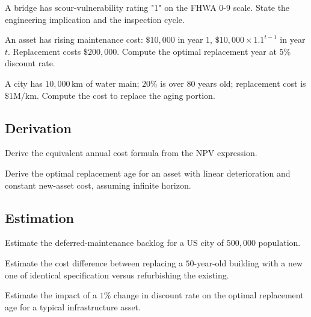 \begin{exercise}
A bridge has scour-vulnerability rating "1" on the FHWA $0$-$9$ scale. State the engineering implication and the inspection cycle.
\end{exercise}

\begin{exercise}
An asset has rising maintenance cost: $\$10{,}000$ in year $1$, $\$10{,}000 \times 1.1^{t-1}$ in year $t$. Replacement costs $\$200{,}000$. Compute the optimal replacement year at $5\%$ discount rate.
\end{exercise}

\begin{exercise}
A city has $10{,}000\,\text{km}$ of water main; $20\%$ is over $80$ years old; replacement cost is $\$1\text{M/km}$. Compute the cost to replace the aging portion.
\end{exercise}

\subsection*{Derivation}

\begin{exercise}
Derive the equivalent annual cost formula from the NPV expression.
\end{exercise}

\begin{exercise}
Derive the optimal replacement age for an asset with linear deterioration and constant new-asset cost, assuming infinite horizon.
\end{exercise}

\subsection*{Estimation}

\begin{exercise}
Estimate the deferred-maintenance backlog for a US city of $500{,}000$ population.
\end{exercise}

\begin{exercise}
Estimate the cost difference between replacing a $50$-year-old building with a new one of identical specification versus refurbishing the existing.
\end{exercise}

\begin{exercise}
Estimate the impact of a $1\%$ change in discount rate on the optimal replacement age for a typical infrastructure asset.
\end{exercise}


